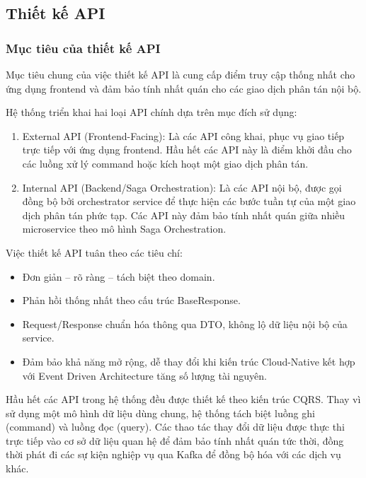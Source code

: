 \subsection{Thiết kế API}

\subsubsection{Mục tiêu của thiết kế API}

Mục tiêu chung của việc thiết kế API là cung cấp điểm truy cập thống nhất cho ứng dụng frontend và đảm bảo tính nhất quán cho các giao dịch phân tán nội bộ.

Hệ thống triển khai hai loại API chính dựa trên mục đích sử dụng:

\begin{enumerate}
    \item External API (Frontend-Facing): Là các API công khai, phục vụ giao tiếp trực tiếp với ứng dụng frontend. Hầu hết các API này là điểm khởi đầu cho các luồng xử lý command hoặc kích hoạt một giao dịch phân tán.
    \item Internal API (Backend/Saga Orchestration): Là các API nội bộ, được gọi đồng bộ bởi orchestrator service để thực hiện các bước tuần tự của một giao dịch phân tán phức tạp. Các API này đảm bảo tính nhất quán giữa nhiều microservice theo mô hình Saga Orchestration.
\end{enumerate}

Việc thiết kế  API tuân theo các tiêu chí:

\begin{itemize}
    \item Đơn giản – rõ ràng – tách biệt theo domain.
    \item Phản hồi thống nhất theo cấu trúc BaseResponse.
    \item Request/Response chuẩn hóa thông qua DTO, không lộ dữ liệu nội bộ của service.
    \item Đảm bảo khả năng mở rộng, dễ thay đổi khi kiến trúc Cloud-Native kết hợp với Event Driven Architecture tăng số lượng tài nguyên.
\end{itemize}

Hầu hết các API trong hệ thống đều được thiết kế theo kiến trúc CQRS. Thay vì sử dụng một mô hình dữ liệu dùng chung, hệ thống tách biệt luồng ghi (command) và luồng đọc (query). Các thao tác thay đổi dữ liệu được thực thi trực tiếp vào cơ sở dữ liệu quan hệ để đảm bảo tính nhất quán tức thời, đồng thời phát đi các sự kiện nghiệp vụ qua Kafka để đồng bộ hóa với các dịch vụ khác.

